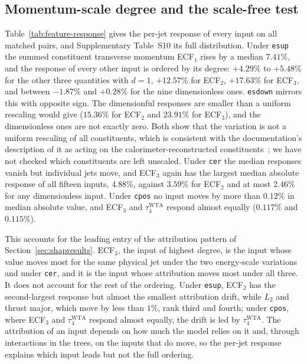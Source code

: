 \documentclass[pdflatex,sn-mathphys,Numbered,iicol]{sn-jnl}
\begin{document}


\subsection{Momentum-scale degree and the scale-free test}
\label{sec:degreeresults}

Table~\ref{tab:feature-response} gives the per-jet response of every input on all
matched pairs, and Supplementary Table~S10 its full distribution. Under \texttt{esup} the summed constituent transverse momentum ECF$_1$
rises by a median $7.41\%$, and the response of every other input is ordered by its degree:
$+4.29\%$ to $+5.48\%$ for the other three quantities with $d=1$, $+12.57\%$ for
ECF$_2$, $+17.63\%$ for ECF$_3$, and between $-1.87\%$ and $+0.28\%$ for the nine
dimensionless ones. \texttt{esdown} mirrors this with opposite sign. The dimensionful
responses are smaller than a uniform rescaling would give ($15.36\%$ for ECF$_2$ and
$23.91\%$ for ECF$_3$), and the dimensionless ones are not exactly zero. Both show that
the variation is not a uniform rescaling of all constituents, which is consistent with
the documentation's description of it as acting on the calorimeter-reconstructed
constituents~\cite{ATLASGitLab}; we have not checked which constituents are left
unscaled. Under \texttt{cer} the median responses vanish but individual
jets move, and ECF$_3$ again has the largest median absolute response of all fifteen
inputs, $4.88\%$, against $3.59\%$ for ECF$_2$ and at most $2.46\%$ for any dimensionless
input. Under \texttt{cpos} no input moves by more than $0.12\%$ in median absolute
value, and ECF$_3$ and $\tau_4^{\mathrm{WTA}}$ respond almost equally ($0.117\%$ and
$0.115\%$).



This accounts for the leading entry of the attribution pattern of
Section~\ref{sec:shapresults}. ECF$_3$, the input of highest degree, is the input whose
value moves most for the same physical jet under the two energy-scale variations and
under \texttt{cer}, and it is the input whose attribution moves most under all three.
It does not account for the rest of the ordering. Under \texttt{esup}, ECF$_2$ has the
second-largest response but almost the smallest attribution drift, while $L_2$ and
thrust major, which move by less than $1\%$, rank third and fourth; under
\texttt{cpos}, where ECF$_3$ and $\tau_4^{\mathrm{WTA}}$ respond almost equally, the
drift is led by $\tau_4^{\mathrm{WTA}}$. The attribution of an input depends on how
much the model relies on it and, through interactions in the trees, on the inputs that
do move, so the per-jet response explains which input leads but not the full
ordering.
\end{document}
